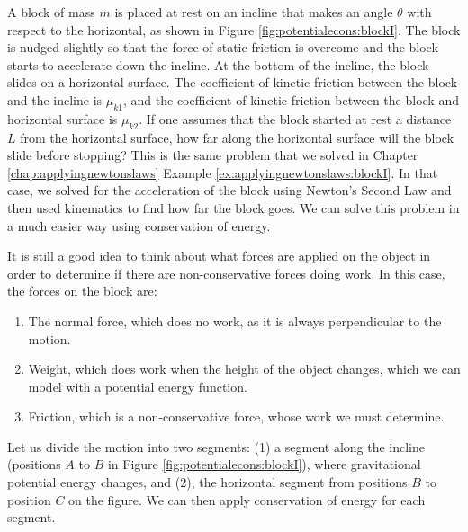 \begin{example}{\label{ex:potentialecons:blockI}
A block of mass $m$ is placed at rest on an incline that makes an angle $\theta$ with respect to the horizontal, as shown in Figure \ref{fig:potentialecons:blockI}. The block is nudged slightly so that the force of static friction is overcome and the block starts to accelerate down the incline. At the bottom of the incline, the block slides on a horizontal surface. The coefficient of kinetic friction between the block and the incline is $\mu_{k1}$, and the coefficient of kinetic friction between the block and horizontal surface is $\mu_{k2}$. If one assumes that the block started at rest a distance $L$ from the horizontal surface, how far along the horizontal surface will the block slide before stopping?}
This is the same problem that we solved in Chapter \ref{chap:applyingnewtonslaws} Example \ref{ex:applyingnewtonslaws:blockI}. In that case, we solved for the acceleration of the block using Newton's Second Law and then used kinematics to find how far the block goes. We can solve this problem in a much easier way using conservation of energy. 

It is still a good idea to think about what forces are applied on the object in order to determine if there are non-conservative forces doing work. In this case, the forces on the block are:
\begin{enumerate}
\item The normal force, which does no work, as it is always perpendicular to the motion.
\item Weight, which does work when the height of the object changes, which we can model with a potential energy function.
\item Friction, which is a non-conservative force, whose work we must determine. 
\end{enumerate}
Let us divide the motion into two segments: (1) a segment along the incline (positions $A$ to $B$ in Figure \ref{fig:potentialecons:blockI}), where gravitational potential energy changes, and (2), the horizontal segment from positions $B$ to position $C$ on the figure. We can then apply conservation of energy for each segment. 


\end{example}
